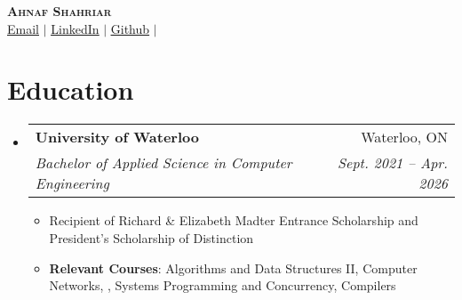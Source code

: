 \documentclass[letterpaper,11pt]{article}
\makeatletter
\newcommand{\resumeItem}[1]{
  \item\small{
    {#1 \vspace{-2pt}}
  }
}
\newcommand{\resumeSubheading}[4]{
  \vspace{-1pt}\item
    \begin{tabular*}{0.97\textwidth}[t]{l@{\extracolsep{\fill}}r}
      \textbf{#1} & #2 \\
      \textit{\small#3} & \textit{\small #4} \\
    \end{tabular*}\vspace{-7pt}
}
\newcommand{\resumeSubHeadingListStart}{\begin{itemize}[leftmargin=0.15in, label={}]}
\newcommand{\resumeSubHeadingListEnd}{\end{itemize}}
\newcommand{\resumeItemListStart}{\begin{itemize}}
\newcommand{\resumeItemListEnd}{\end{itemize}\vspace{-5pt}}
\makeatother
\begin{document}

\begin{center}
    \textbf{\Huge \scshape Ahnaf Shahriar} \\ \vspace{1pt}
    \small \href{mailto:ahnaf.shahriar@uwaterloo.ca}{\underline{Email}} $|$ 
    \href{https://linkedin.com/in/ahnaf-s}{\underline{LinkedIn}} $|$
    \href{https://github.com/shahriarAhnaf}{\underline{Github}} $|$
\end{center}


\section{Education}
  \resumeSubHeadingListStart
    \resumeSubheading
      {University of Waterloo}{Waterloo, ON}
      {Bachelor of Applied Science in Computer Engineering}{Sept. 2021 -- Apr. 2026}
    \resumeItemListStart
      \resumeItem{Recipient of Richard \& Elizabeth Madter Entrance Scholarship and President’s Scholarship of Distinction }
      \resumeItem{\textbf{Relevant Courses}: Algorithms and Data Structures II,  Computer Networks, , Systems Programming and Concurrency, Compilers}

    \resumeItemListEnd
  \resumeSubHeadingListEnd


\end{document}
